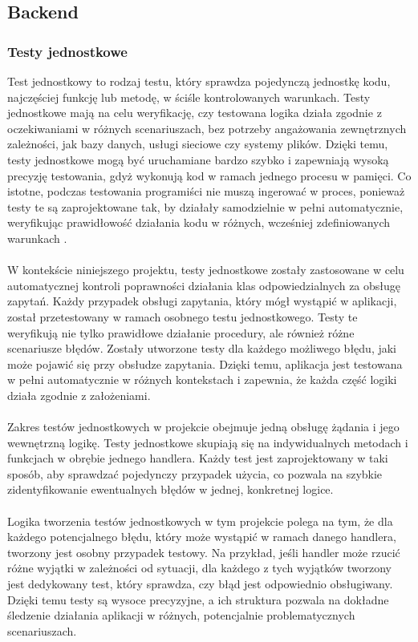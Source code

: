\documentclass[twoside]{projektInzynierskiMS1}
\begin{document}
\newpage

\subsection{Backend}

\subsubsection{Testy jednostkowe}

\noindent
Test jednostkowy to rodzaj testu, który sprawdza pojedynczą jednostkę kodu, najczęściej funkcję lub metodę, w ściśle kontrolowanych warunkach. Testy jednostkowe mają na celu weryfikację, czy testowana logika działa zgodnie z oczekiwaniami w różnych scenariuszach, bez potrzeby angażowania zewnętrznych zależności, jak bazy danych, usługi sieciowe czy systemy plików. Dzięki temu, testy jednostkowe mogą być uruchamiane bardzo szybko i zapewniają wysoką precyzję testowania, gdyż wykonują kod w ramach jednego procesu w pamięci. Co istotne, podczas testowania programiści nie muszą ingerować w proces, ponieważ testy te są zaprojektowane tak, by działały samodzielnie w pełni automatycznie, weryfikując prawidłowość działania kodu w różnych, wcześniej zdefiniowanych warunkach \cite{TestyJednostkowe}.
\\\\
W kontekście niniejszego projektu, testy jednostkowe zostały zastosowane w celu automatycznej kontroli poprawności działania klas odpowiedzialnych za obsługę zapytań. Każdy przypadek obsługi zapytania, który mógł wystąpić w aplikacji, został przetestowany w ramach osobnego testu jednostkowego. Testy te weryfikują nie tylko prawidłowe działanie procedury, ale również różne scenariusze błędów. Zostały utworzone testy dla każdego możliwego błędu, jaki może pojawić się przy obsłudze zapytania. Dzięki temu, aplikacja jest testowana w pełni automatycznie w różnych kontekstach i zapewnia, że każda część logiki działa zgodnie z założeniami.
\\\\
Zakres testów jednostkowych w projekcie obejmuje jedną obsługę żądania i jego wewnętrzną logikę. Testy jednostkowe skupiają się na indywidualnych metodach i funkcjach w obrębie jednego handlera. Każdy test jest zaprojektowany w taki sposób, aby sprawdzać pojedynczy przypadek użycia, co pozwala na szybkie zidentyfikowanie ewentualnych błędów w jednej, konkretnej logice.
\\\\
Logika tworzenia testów jednostkowych w tym projekcie polega na tym, że dla każdego potencjalnego błędu, który może wystąpić w ramach danego handlera, tworzony jest osobny przypadek testowy. Na przykład, jeśli handler może rzucić różne wyjątki w zależności od sytuacji, dla każdego z tych wyjątków tworzony jest dedykowany test, który sprawdza, czy błąd jest odpowiednio obsługiwany. Dzięki temu testy są wysoce precyzyjne, a ich struktura pozwala na dokładne śledzenie działania aplikacji w różnych, potencjalnie problematycznych scenariuszach. 
\end{document}
